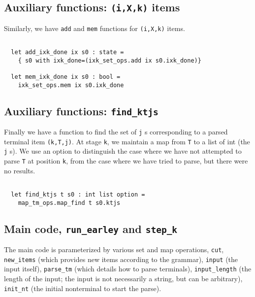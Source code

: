 \documentclass[]{article}
\begin{document}
\begin{multicols}{2}
\begin{verbatim}
\end{verbatim}

\subsection{Auxiliary functions: \texttt{(i,X,k)} items}

Similarly, we have \texttt{add} and \texttt{mem} functions for
\texttt{(i,X,k)} items.

\begin{verbatim}

  let add_ixk_done ix s0 : state =
    { s0 with ixk_done=(ixk_set_ops.add ix s0.ixk_done)}

  let mem_ixk_done ix s0 : bool =
    ixk_set_ops.mem ix s0.ixk_done 

\end{verbatim}

\subsection{Auxiliary functions: \texttt{find\_ktjs}}

Finally we have a function to find the set of \texttt{j} s corresponding
to a parsed terminal item \texttt{(k,T,j)}. At stage \texttt{k}, we
maintain a map from \texttt{T} to a list of int (the \texttt{j} s). We
use an option to distinguish the case where we have not attempted to
parse \texttt{T} at position \texttt{k}, from the case where we have
tried to parse, but there were no results.

\begin{verbatim}

  let find_ktjs t s0 : int list option =
    map_tm_ops.map_find t s0.ktjs

\end{verbatim}

\subsection{Main code, \texttt{run\_earley} and \texttt{step\_k}}

The main code is parameterized by various set and map operations,
\texttt{cut}, \texttt{new\_items} (which provides new items according to
the grammar), \texttt{input} (the input itself), \texttt{parse\_tm}
(which details how to parse terminals), \texttt{input\_length} (the
length of the input; the input is not necessarily a string, but can be
arbitrary), \texttt{init\_nt} (the initial nonterminal to start the
parse).


\end{multicols}
\end{document}

